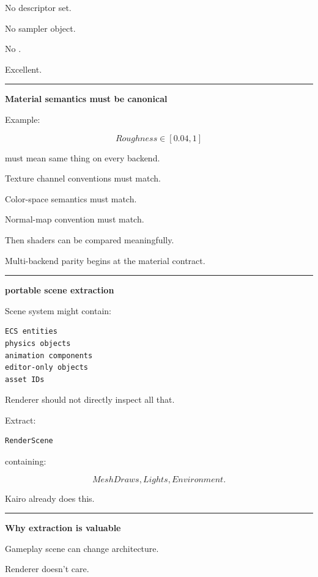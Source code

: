 No descriptor set.

No sampler object.

No .

Excellent.

\begin{center}\rule{0.5\linewidth}{0.5pt}\end{center}

\textbf{Material semantics must be canonical}

Example:

\[
Roughness\in[0.04,1]
\]

must mean same thing on every backend.

Texture channel conventions must match.

Color-space semantics must match.

Normal-map convention must match.

Then shaders can be compared meaningfully.

Multi-backend parity begins at the material contract.

\begin{center}\rule{0.5\linewidth}{0.5pt}\end{center}

\textbf{portable scene extraction}

Scene system might contain:

\begin{verbatim}
ECS entities
physics objects
animation components
editor-only objects
asset IDs
\end{verbatim}

Renderer should not directly inspect all that.

Extract:

\begin{verbatim}
RenderScene
\end{verbatim}

containing:

\[
MeshDraws,
Lights,
Environment.
\]

Kairo already does this.

\begin{center}\rule{0.5\linewidth}{0.5pt}\end{center}

\textbf{Why extraction is valuable}

Gameplay scene can change architecture.

Renderer doesn't care.

